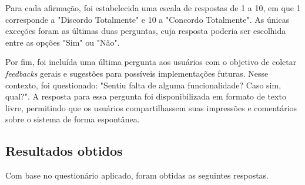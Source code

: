 Para cada afirmação, foi estabelecida uma escala de respostas de 1 a 10, em que 1 corresponde a "Discordo Totalmente" e 10 a "Concordo Totalmente". As únicas exceções foram as últimas duas perguntas, cuja resposta poderia ser escolhida entre as opções "Sim" ou "Não".

Por fim, foi incluída uma última pergunta aos usuários com o objetivo de coletar \textit{feedbacks} gerais e sugestões para possíveis implementações futuras. Nesse contexto, foi questionado: "Sentiu falta de alguma funcionalidade? Caso sim, qual?". A resposta para essa pergunta foi disponibilizada em formato de texto livre, permitindo que os usuários compartilhassem suas impressões e comentários sobre o sistema de forma espontânea.


\subsection{Resultados obtidos}\label{ref:avaliação}

Com base no questionário aplicado, foram obtidas as seguintes respostas.

